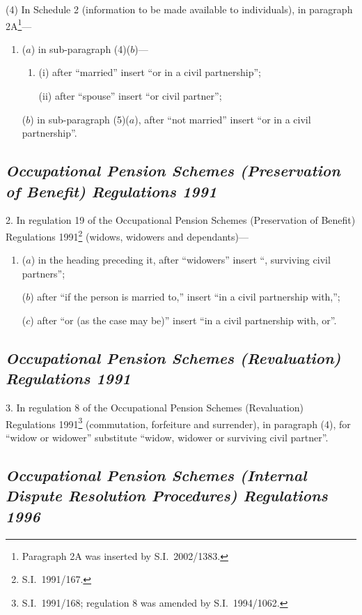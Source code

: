 \documentclass[12pt,a4paper]{article}
\begin{document}
(4) In Schedule 2 (information to be made available to individuals), in paragraph 2A\footnote{Paragraph 2A was inserted by S.I.\ 2002/1383.}—
\begin{enumerate}\item[]
($a$) in sub-paragraph (4)($b$)—
\begin{enumerate}\item[]
(i) after “married” insert “or in a civil partnership”;

(ii) after “spouse” insert “or civil partner”;
\end{enumerate}

($b$) in sub-paragraph (5)($a$), after “not married” insert “or in a civil partnership”.
\end{enumerate}

\subsection*{\itshape Occupational Pension Schemes (Preservation of Benefit) Regulations 1991}

2.  In regulation 19 of the Occupational Pension Schemes (Preservation of Benefit) Regulations 1991\footnote{S.I.\ 1991/167.} (widows, widowers and dependants)—
\begin{enumerate}\item[]
($a$) in the heading preceding it, after “widowers” insert “, surviving civil partners”;

($b$) after “if the person is married to,” insert “in a civil partnership with,”;

($c$) after “or (as the case may be)” insert “in a civil partnership with, or”.
\end{enumerate}

\subsection*{\itshape\sloppy Occupational Pension Schemes (Revaluation) Regulations 1991}

3.  In regulation 8 of the Occupational Pension Schemes (Revaluation) Regulations 1991\footnote{S.I.\ 1991/168; regulation 8 was amended by S.I.\ 1994/1062.} (commutation, forfeiture and surrender), in paragraph (4), for “widow or widower” substitute “widow, widower or surviving civil partner”.

\subsection*{\itshape Occupational Pension Schemes (Internal Dispute Resolution Procedures) Regulations 1996}
\end{document}

